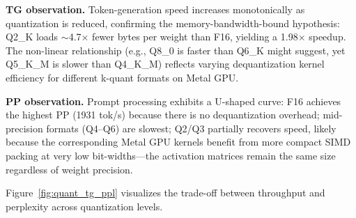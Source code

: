 \documentclass[11pt,a4paper]{article}
\begin{document}
\textbf{TG observation.}
Token-generation speed increases monotonically as quantization is reduced,
confirming the memory-bandwidth-bound hypothesis: Q2\_K loads $\sim$4.7$\times$
fewer bytes per weight than F16, yielding a 1.98$\times$ speedup.
The non-linear relationship (e.g., Q8\_0 is faster than Q6\_K might suggest,
yet Q5\_K\_M is slower than Q4\_K\_M) reflects varying dequantization kernel
efficiency for different k-quant formats on Metal GPU.

\textbf{PP observation.}
Prompt processing exhibits a U-shaped curve: F16 achieves the highest PP
(1931 tok/s) because there is no dequantization overhead; mid-precision formats
(Q4--Q6) are slowest; Q2/Q3 partially recovers speed, likely because the
corresponding Metal GPU kernels benefit from more compact SIMD packing at very
low bit-widths---the activation matrices remain the same size regardless of
weight precision.

Figure~\ref{fig:quant_tg_ppl} visualizes the trade-off between throughput and
perplexity across quantization levels.
\end{document}
